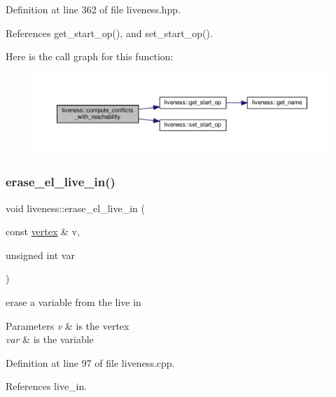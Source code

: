 Definition at line 362 of file liveness.\+hpp.



References get\+\_\+start\+\_\+op(), and set\+\_\+start\+\_\+op().

Here is the call graph for this function\+:
\nopagebreak
\begin{figure}[H]
\begin{center}
\leavevmode
\includegraphics[width=350pt]{d3/d1f/classliveness_abb7fa56c7956948411c80808825906a9_cgraph}
\end{center}
\end{figure}
\mbox{\label{classliveness_a55189aee9cff0fbc03524210c2f8f5e8}} 
\subsubsection{\texorpdfstring{erase\+\_\+el\+\_\+live\+\_\+in()}{erase\_el\_live\_in()}}
{\footnotesize\ttfamily void liveness\+::erase\+\_\+el\+\_\+live\+\_\+in (\begin{DoxyParamCaption}\item[{const \hyperlink{graph_8hpp_abefdcf0544e601805af44eca032cca14}{vertex} \&}]{v,  }\item[{unsigned int}]{var }\end{DoxyParamCaption})}



erase a variable from the live in 


\begin{DoxyParams}{Parameters}
{\em v} & is the vertex \\
\hline
{\em var} & is the variable \\
\hline
\end{DoxyParams}


Definition at line 97 of file liveness.\+cpp.



References live\+\_\+in.

